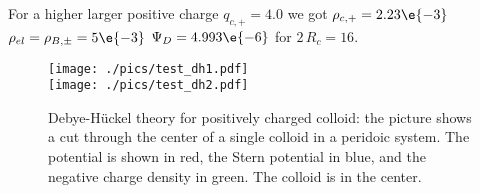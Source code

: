 For a higher larger positive charge $q_{c,+}=4.0$ we got
$\rho_{c,+}=2.23\e{-3}$
$\rho_{el}=\rho_{B,\pm}=5\e{-3}$ 
$\Psi_D=4.993\e{-6}$ for $2\,R_c=16$.

\begin{figure}[htpb]
\texttt{[image: ./pics/test\_dh1.pdf]}\\
\texttt{[image: ./pics/test\_dh2.pdf]}
\caption{Debye-H\"uckel theory for positively charged colloid: the picture
shows a cut through the center of a single colloid in a peridoic system.
The potential is shown in red, the Stern potential in blue, and the negative 
charge density in green. The colloid is in the center.}
\label{fig7}
\end{figure}
\clearpage
